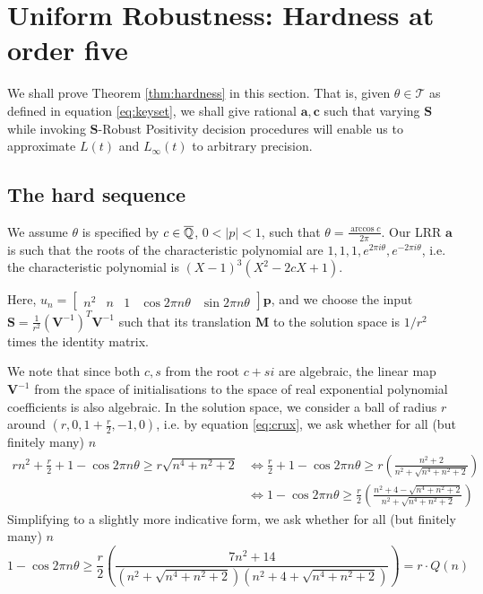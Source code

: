 \section{Uniform Robustness: Hardness at order five}
\label{section:hardness}
We shall prove Theorem \ref{thm:hardness} in this section. That is, given $\theta \in \mathcal{T}$ as defined in equation \ref{eq:keyset}, we shall give rational $\mathbf{a}, \mathbf{c}$ such that varying $\mathbf{S}$ while invoking $\mathbf{S}$-Robust Positivity decision procedures will enable us to approximate $L(t)$ and $L_\infty(t)$ to arbitrary precision.

\subsection{The hard sequence}
We assume $\theta$ is specified by $c \in \overline{\mathbb{Q}}$, $0 < |p| < 1$, such that $\theta = \frac{\arccos c}{2\pi}$. Our LRR $\mathbf{a}$ is such that the roots of the characteristic polynomial are $1, 1, 1, e^{2\pi i\theta}, e^{-2\pi i \theta}$, i.e. the characteristic polynomial is 
$
(X- 1)^3(X^2 - 2cX + 1)
$.

Here, 
$
u_n = \begin{bmatrix}
n^2 & n & 1 & \cos 2\pi n\theta & \sin 2\pi n\theta
\end{bmatrix}
\mathbf{p}
$, and we choose the input $\mathbf{S} = \frac{1}{r^2}(\mathbf{V}^{-1})^T\mathbf{V}^{-1}$ such that its translation $\mathbf{M}$ to the solution space is $1/r^2$ times the identity matrix.

We note that since both $c, s$ from the root $c + si$ are algebraic, the linear map $\mathbf{V}^{-1}$ from the space of initialisations to the space of real exponential polynomial coefficients is also algebraic. In the solution space, we consider a ball of radius $r$ around $(r, 0, 1+\frac{r}{2}, -1, 0)$, i.e. by equation \ref{eq:crux}, we ask whether for all (but finitely many) $n$
\begin{align*}
rn^2 + \frac{r}{2} + 1 - \cos 2\pi n\theta \ge r\sqrt{n^4 + n^2 + 2} 
&\Leftrightarrow \frac{r}{2} + 1 - \cos 2\pi n\theta \ge r\left(\frac{n^2 + 2}{n^2 + \sqrt{n^4 + n^2 + 2}}\right) \\
&\Leftrightarrow 1 - \cos 2\pi n\theta \ge \frac{r}{2}\left(\frac{n^2 + 4 - \sqrt{n^4 + n^2 + 2}}{n^2 + \sqrt{n^4 + n^2 + 2}}\right)
\end{align*}
Simplifying to a slightly more indicative form, we ask whether for all (but finitely many) $n$
\begin{equation}
\label{eq:pivotal}
1 - \cos 2\pi n\theta \ge \frac{r}{2}\left(\frac{7n^2 + 14}{(n^2 + \sqrt{n^4 + n^2 + 2})(n^2 +4+  \sqrt{n^4 + n^2 + 2})}\right) = r\cdot Q(n)
\end{equation}

